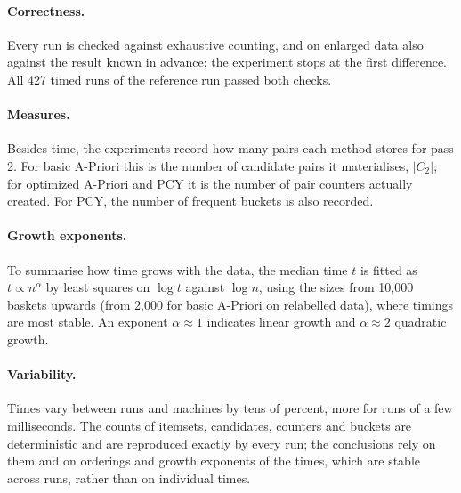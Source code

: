 \paragraph{Correctness.} Every run is checked against exhaustive counting, and on enlarged data also against the result known in advance; the experiment stops at the first difference. All 427 timed runs of the reference run passed both checks.

\paragraph{Measures.} Besides time, the experiments record how many pairs each method stores for pass 2. For basic A-Priori this is the number of candidate pairs it materialises, $|C_2|$; for optimized A-Priori and PCY it is the number of pair counters actually created. For PCY, the number of frequent buckets is also recorded.

\paragraph{Growth exponents.} To summarise how time grows with the data, the median time $t$ is fitted as $t \propto n^{\alpha}$ by least squares on $\log t$ against $\log n$, using the sizes from 10{,}000 baskets upwards (from 2{,}000 for basic A-Priori on relabelled data), where timings are most stable. An exponent $\alpha \approx 1$ indicates linear growth and $\alpha \approx 2$ quadratic growth.

\paragraph{Variability.} Times vary between runs and machines by tens of percent, more for runs of a few milliseconds. The counts of itemsets, candidates, counters and buckets are deterministic and are reproduced exactly by every run; the conclusions rely on them and on orderings and growth exponents of the times, which are stable across runs, rather than on individual times.
